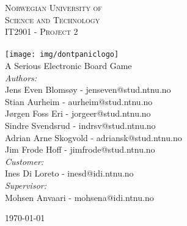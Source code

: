\begin{center}



\textsc{\LARGE Norwegian University of\\ Science and Technology}\\[1.5cm]

\textsc{\Large IT2901 - Project 2}\\[0.5cm]

\HRule \\[0.4cm]
{%
	\texttt{[image: img/dontpaniclogo]}\\[0.4cm]}
	A Serious Electronic Board Game
\HRule \\[1.5cm]


	\emph{Authors:}\\
	Jens Even Blomsøy 		- 	jenseven@stud.ntnu.no\\
	Stian Aurheim 		- 	aurheim@stud.ntnu.no\\
	Jørgen Foss Eri 		-	jorgeer@stud.ntnu.no\\
	Sindre Svendsrud 		-	indrsv@stud.ntnu.no\\
	Adrian Arne Skogvold 	- 	adriansk@stud.ntnu.no\\
	Jim Frode Hoff 		- 	jimfrode@stud.ntnu.no\\
	\vspace{10 mm}
	\emph{Customer:} \\
	Ines Di Loreto		- 	inesd@idi.ntnu.no\\
	\vspace{10 mm}
	\emph{Supervisor:} \\
	Mohsen Anvaari		-	mohsena@idi.ntnu.no\\

\vfill

{\large \today}

\end{center}
\pagebreak
